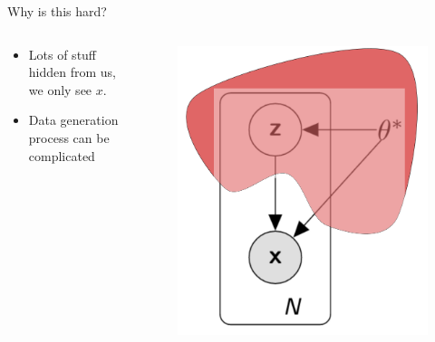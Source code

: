 \documentclass{beamer}
\begin{document}
\begin{frame}{Why is this hard?}
    \begin{columns}[T]
        \begin{column}{.5\textwidth}
            \begin{itemize}
                \item{
                    Lots of stuff hidden from us, we only see $x$.
                }
                \item {
                    Data generation process can be complicated
                }
            \end{itemize}
        \end{column}

        \begin{column}{.4\textwidth}
            \begin{figure}
                \centering
                \includegraphics[width=\textwidth]{latent_hidden}
            \end{figure}

        \end{column}
    \end{columns}
\end{frame}
\end{document}
